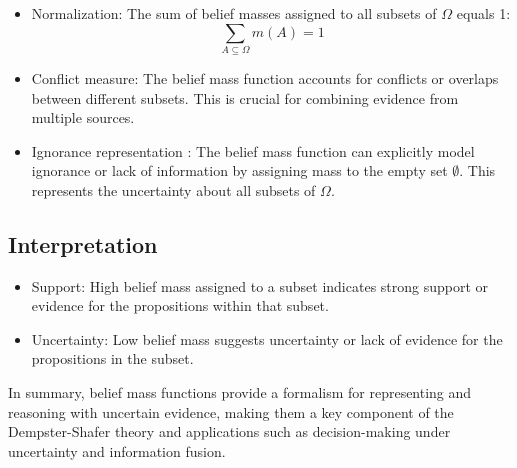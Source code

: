 \begin{itemize}
    \item Normalization: The sum of belief masses assigned to all subsets of $ \Omega $ equals 1:
          $$ \sum_{A \subseteq \Omega} m(A) = 1 $$
    \item Conflict measure: The belief mass function accounts for conflicts or overlaps between different subsets. This is crucial for combining evidence from multiple sources.
    \item Ignorance representation : The belief mass function can explicitly model ignorance or lack of information by assigning mass to the empty set $\emptyset$.
          This represents the uncertainty about all subsets of $ \Omega $.
\end{itemize}

\subsection{Interpretation}

\begin{itemize}
    \item Support: High belief mass assigned to a subset indicates strong support or evidence for the propositions within that subset.
    \item Uncertainty: Low belief mass suggests uncertainty or lack of evidence for the propositions in the subset.
\end{itemize}

In summary, belief mass functions provide a formalism for representing and reasoning with uncertain evidence, making them a key component of the Dempster-Shafer theory and applications such as decision-making under uncertainty and information fusion.